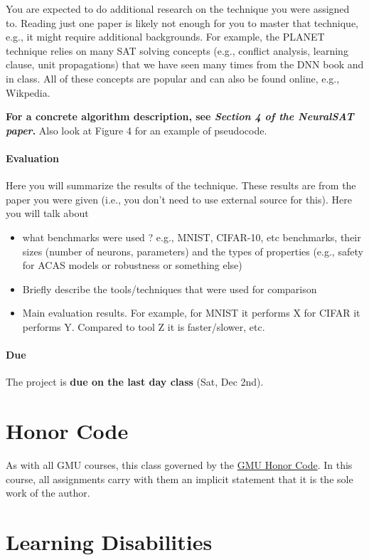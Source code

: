 \documentclass[11pt]{article}
\begin{document}
You are expected to do additional research on the technique you were assigned to. Reading just one paper is likely not enough for you to master that technique, e.g., it might require additional backgrounds.  For example, the PLANET technique relies on many SAT solving concepts (e.g., conflict analysis, learning clause, unit propagations) that we have seen many times from the DNN book and in class.  All of these concepts are popular and can also be found online, e.g., Wikpedia. 

\textbf{For a concrete algorithm description, see \emph{Section 4 of the NeuralSAT paper}.} Also look at Figure 4 for an example of pseudocode.

\paragraph{Evaluation} Here you will summarize the results of the technique. These results are from the paper you were given (i.e., you don't need to use external source for this). Here you will talk about
\begin{itemize}
    \item what benchmarks were used ?  e.g.,  MNIST, CIFAR-10, etc benchmarks, their sizes (number of neurons, parameters)  and the types of properties (e.g., safety for ACAS models or robustness or something else)
    \item Briefly describe the tools/techniques that were used for comparison
    \item Main evaluation results.  For example, for MNIST it performs X for CIFAR it performs Y.  Compared to tool Z it is faster/slower, etc.
\end{itemize}


\paragraph{Due} The project is \textbf{due on the last day class} (Sat, Dec 2nd).

\section{Honor Code}
\label{sec:orgf24f4c5}

As with all GMU courses, this class governed by the \href{http://oai.gmu.edu/the-mason-honor-code/}{GMU Honor Code}. In this course, all assignments carry with them an implicit statement that it is the sole work of the author.

\section{Learning Disabilities}
\label{sec:org28deb33}
\end{document}
